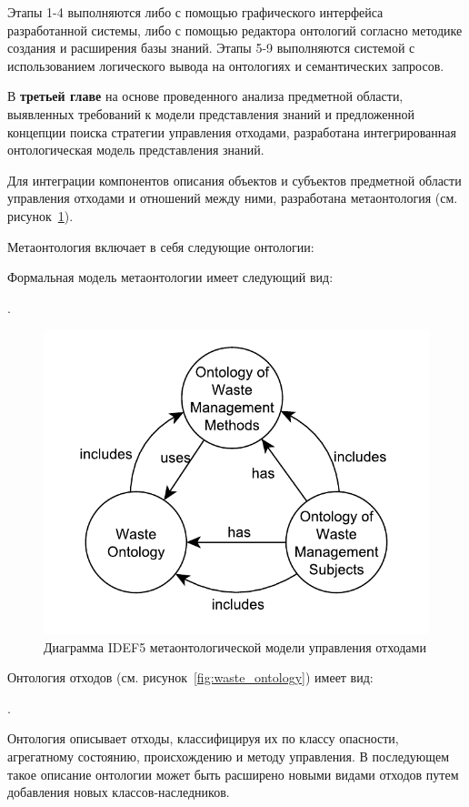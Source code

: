 \documentclass[a4paper]{G2-105}
\begin{document}
Этапы 1-4 выполняются либо с помощью графического интерфейса разработанной системы, либо с помощью редактора онтологий согласно методике создания и расширения базы знаний. Этапы 5-9 выполняются системой с использованием логического вывода на онтологиях и семантических запросов.

В \textbf{третьей главе} на основе проведенного анализа предметной области, выявленных требований к модели представления знаний и предложенной концепции поиска стратегии управления отходами, разработана интегрированная онтологическая модель представления знаний.

Для интеграции компонентов описания объектов и субъектов предметной области управления отходами и отношений между ними, разработана метаонтология (см. рисунок~\ref{fig:metaontology}).

Метаонтология включает в себя следующие онтологии: \CommonMetaontologyModels

Формальная модель метаонтологии имеет следующий вид:

\CommonMetaontologyFormulaCompact.

\begin{figure}[H]
\centering
\includegraphics[scale=0.8]{metaontology}
\caption{Диаграмма IDEF5 метаонтологической модели управления отходами}
\label{fig:metaontology}
\end{figure}

Онтология отходов (см. рисунок~\ref{fig:waste_ontology}) имеет вид: 

\CommonWasteOntologyCompact. 

Онтология описывает отходы, классифицируя их по классу опасности, агрегатному состоянию, происхождению и методу управления. В последующем такое описание онтологии может быть расширено новыми видами отходов путем добавления новых классов-наследников.
\end{document}
